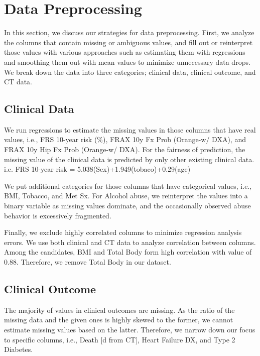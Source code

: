 \section{Data Preprocessing}
\label{sec:preprocessing}

In this section, we discuss our strategies for data preprocessing.
First, we analyze the columns that contain missing or ambiguous values, and fill out or reinterpret those values with various approaches such as estimating them with regressions and smoothing them out with mean values to minimize unnecessary data drops.
We break down the data into three categories; clinical data, clinical outcome, and CT data.

\subsection{Clinical Data}
We run regressions to estimate the missing values in those columns that have real values, i.e., FRS 10-year risk (\%), FRAX 10y Fx Prob (Orange-w/ DXA), and FRAX 10y Hip Fx Prob (Orange-w/ DXA). 
For the fairness of prediction, the missing value of the clinical data is predicted by only other existing clinical data. i.e. FRS 10-year risk = 5.038(Sex)+1.949(tobaco)+0.29(age) 

We put additional categories for those columns that have categorical values, i.e., BMI, Tobacco, and Met Sx. For Alcohol abuse, we reinterpret the values into a binary variable as missing values dominate, and the occasionally observed abuse behavior is excessively fragmented. 
    
Finally, we exclude highly correlated columns to minimize regression analysis errors. We use both clinical and CT data to analyze correlation between columns.
Among the candidates, BMI and Total Body form high correlation with value of 0.88.
Therefore, we remove Total Body in our dataset.

\subsection{Clinical Outcome}
The majority of values in clinical outcomes are missing.
As the ratio of the missing data and the given ones is highly skewed to the former, we cannot estimate missing values based on the latter.
Therefore, we narrow down our focus to specific columns, i.e., Death $[$d from CT$]$, Heart Failure DX, and Type 2 Diabetes.

